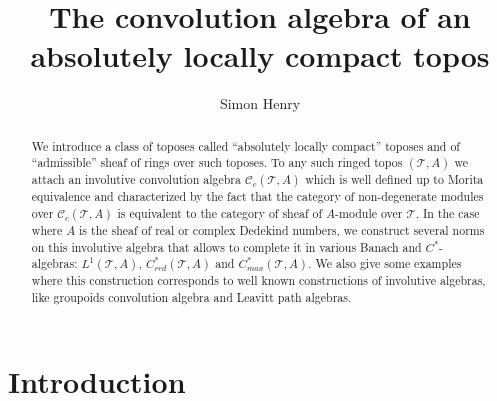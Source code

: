 \documentclass[a4paper]{article}
\newcommand{\Tcal}{\mathcal{T}}
\begin{document}
\pagestyle{plain}
\title{The convolution algebra of an absolutely locally compact topos}
\author{Simon Henry}

\maketitle

\begin{abstract}

We introduce a class of toposes called ``absolutely locally compact'' toposes and of ``admissible'' sheaf of rings over such toposes. To any such ringed topos $(\mathcal{T},A)$ we attach an involutive convolution algebra $\mathcal{C}_c(\mathcal{T},A)$ which is well defined up to Morita equivalence and characterized by the fact that the category of non-degenerate modules over $\mathcal{C}_c(\mathcal{T},A)$ is equivalent to the category of sheaf of $A$-module over $\mathcal{T}$. In the case where $A$ is the sheaf of real or complex Dedekind numbers, we construct several norms on this involutive algebra that allows to complete it in various Banach and $C^*$-algebras: $L^1(\Tcal,A)$, $C^*_{red}(\Tcal,A)$ and $C^*_{max}(\Tcal,A)$. We also give some examples where this construction corresponds to well known constructions of involutive algebras, like groupoids convolution algebra and  Leavitt path algebras.

\end{abstract}

\renewcommand{\thefootnote}{\fnsymbol{footnote}} 
\renewcommand{\thefootnote}{\arabic{footnote}} 




\tableofcontents

\section{Introduction}
\end{document}
